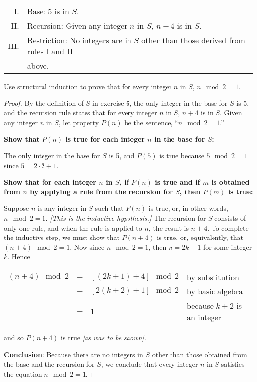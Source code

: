 \documentclass[14pt]{extarticle}
\newcommand{\cy}{\color{cyan}}
\begin{document}
\begin{tabular}{rl}
    I.   & Base: 5 is in $S$.                                                               \\
    II.  & Recursion: Given any integer $n$ in $S$, $n + 4$ is in $S$.                      \\
    III. & Restriction: No integers are in $S$ other than those derived from rules I and II \\
         & above.
\end{tabular}

Use structural induction to prove that for every integer $n$ in $S$, $n \mod 2 = 1$.

\begin{proof}
    By the definition of $S$ in exercise 6, the only integer in the base for $S$ is 5, and the recursion rule states that
    for every integer $n$ in $S$, \(n + 4\) is in $S$. Given any integer $n$ in $S$, let property $P(n)$ be the
    sentence, “\(n \mod 2 = 1\).”

    {\bf Show that $P(n)$ is true for each integer $n$ in the base for $S$:}

    The only integer in the base for $S$ is 5, and $P(5)$ is true because \(5 \mod 2 = 1\) since \(5 = 2 \cdot 2 + 1\).

        {\bf Show that for each integer $n$ in $S$, if $P(n)$ is true and if $m$ is obtained from $n$ by applying a rule
            from the recursion for $S$, then $P(m)$ is true:}

    Suppose $n$ is any integer in $S$ such that $P(n)$ is true, or, in other words, \(n \mod 2 = 1\). {\it [This is the
                inductive hypothesis.]} The recursion for $S$ consists of only one rule, and when the rule is applied to $n$, the
    result is \(n + 4\). To complete the inductive step, we must show that \(P(n + 4)\) is true, or, equivalently, that
    \((n + 4) \mod 2 = 1\). Now since \(n \mod 2 = 1\), then \(n = 2k + 1\) for some integer $k$. Hence
    \begin{center}
        \begin{tabular}{rcll}
            \((n + 4) \mod 2\) & = & \([(2k + 1) + 4] \mod 2\) & {\cy by substitution}               \\
                               & = & \([2(k + 2) + 1] \mod 2\) & {\cy by basic algebra}              \\
                               & = & 1                         & {\cy because $k + 2$ is an integer}
        \end{tabular}
    \end{center}
    and so $P(n + 4)$ is true {\it [as was to be shown].}

        {\bf Conclusion:} Because there are no integers in $S$ other than those obtained from the base and the recursion
    for $S$, we conclude that every integer $n$ in $S$ satisfies the equation \(n \mod 2 = 1\).
\end{proof}
\end{document}
